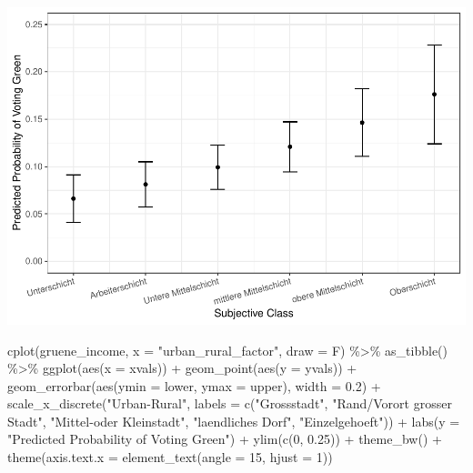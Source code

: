 \documentclass[
]{article}
\newenvironment{Shaded}{\begin{snugshade}}{\end{snugshade}}
\newcommand{\AttributeTok}[1]{\textcolor[rgb]{0.77,0.63,0.00}{#1}}
\newcommand{\DecValTok}[1]{\textcolor[rgb]{0.00,0.00,0.81}{#1}}
\newcommand{\FloatTok}[1]{\textcolor[rgb]{0.00,0.00,0.81}{#1}}
\newcommand{\FunctionTok}[1]{\textcolor[rgb]{0.00,0.00,0.00}{#1}}
\newcommand{\NormalTok}[1]{#1}
\newcommand{\SpecialCharTok}[1]{\textcolor[rgb]{0.00,0.00,0.00}{#1}}
\newcommand{\StringTok}[1]{\textcolor[rgb]{0.31,0.60,0.02}{#1}}
\begin{document}
\includegraphics{AVCD_Final_Assignment-Edenhofer_files/figure-latex/gruene-subjective-class-1.pdf}

\begin{Shaded}
\begin{Highlighting}[]
\FunctionTok{cplot}\NormalTok{(gruene\_income, }\AttributeTok{x =} \StringTok{"urban\_rural\_factor"}\NormalTok{, }\AttributeTok{draw =}\NormalTok{ F) }\SpecialCharTok{\%\textgreater{}\%}
  \FunctionTok{as\_tibble}\NormalTok{() }\SpecialCharTok{\%\textgreater{}\%}
  \FunctionTok{ggplot}\NormalTok{(}\FunctionTok{aes}\NormalTok{(}\AttributeTok{x =}\NormalTok{ xvals)) }\SpecialCharTok{+}
  \FunctionTok{geom\_point}\NormalTok{(}\FunctionTok{aes}\NormalTok{(}\AttributeTok{y =}\NormalTok{ yvals)) }\SpecialCharTok{+}
  \FunctionTok{geom\_errorbar}\NormalTok{(}\FunctionTok{aes}\NormalTok{(}\AttributeTok{ymin =}\NormalTok{ lower, }\AttributeTok{ymax =}\NormalTok{ upper), }\AttributeTok{width =} \FloatTok{0.2}\NormalTok{) }\SpecialCharTok{+}
  \FunctionTok{scale\_x\_discrete}\NormalTok{(}\StringTok{"Urban{-}Rural"}\NormalTok{, }
                   \AttributeTok{labels =} \FunctionTok{c}\NormalTok{(}\StringTok{"Grossstadt"}\NormalTok{, }\StringTok{"Rand/Vorort grosser Stadt"}\NormalTok{,}
                              \StringTok{"Mittel{-}oder Kleinstadt"}\NormalTok{, }\StringTok{"laendliches Dorf"}\NormalTok{,}
                              \StringTok{"Einzelgehoeft"}\NormalTok{)) }\SpecialCharTok{+}
 \FunctionTok{labs}\NormalTok{(}\AttributeTok{y =} \StringTok{"Predicted Probability of Voting Green"}\NormalTok{) }\SpecialCharTok{+}
 \FunctionTok{ylim}\NormalTok{(}\FunctionTok{c}\NormalTok{(}\DecValTok{0}\NormalTok{, }\FloatTok{0.25}\NormalTok{)) }\SpecialCharTok{+}
 \FunctionTok{theme\_bw}\NormalTok{() }\SpecialCharTok{+}
 \FunctionTok{theme}\NormalTok{(}\AttributeTok{axis.text.x =} \FunctionTok{element\_text}\NormalTok{(}\AttributeTok{angle =} \DecValTok{15}\NormalTok{, }\AttributeTok{hjust =} \DecValTok{1}\NormalTok{))}
\end{Highlighting}
\end{Shaded}
\end{document}
